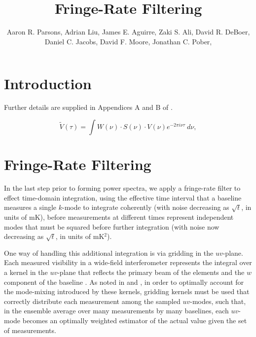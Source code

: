 \documentclass[twocolumn,numberedappendix]{emulateapj}
\begin{document}
\title{Fringe-Rate Filtering}

\author{
Aaron R. Parsons,
Adrian Liu,
James E. Aguirre,
Zaki S. Ali,
David R. DeBoer,
Daniel C. Jacobs,
David F. Moore,
Jonathan C. Pober,
}


\begin{abstract}
\end{abstract}


\section{Introduction}

Further details are supplied in Appendices A and B of \citet{parsons_et_al2013}.

\begin{equation}
\tilde{V}(\tau)=\int{W(\nu)\cdot S(\nu)\cdot V(\nu)e^{-2\pi i\nu\tau}~d\nu},
\label{eq:dtransform}
\end{equation}

\section{Fringe-Rate Filtering}
\label{sec:fringe_rate_filtering}

In the last step prior to forming power spectra,
we apply a fringe-rate filter to effect time-domain integration,
using the effective time interval that a baseline measures a single $k$-mode to integrate coherently
(with noise decreasing
as $\sqrt{t}$, in units of mK), before measurements at different times represent independent modes
that must be squared before further integration (with noise now decreasing as $\sqrt{t}$, in units of mK$^2$).

One way of handling this additional integration is via gridding in the $uv$-plane.
Each measured visibility in a wide-field interferometer represents the integral over a kernel in
the $uv$-plane that reflects the primary beam of the elements \citep{bhatnagar_et_al2008,morales_matejek2009} and the $w$ component 
of the baseline \citep{cornwell_et_al2003}.  As noted in
\citet{sullivan_et_al2012} and \citet{morales_matejek2009},
in order to optimally account for the mode-mixing introduced by these kernels, gridding kernels must be
used that correctly distribute each measurement among the sampled $uv$-modes, such that, in the ensemble average
over many measurements by many baselines, each $uv$-mode becomes an optimally weighted estimator of the actual
value given the set of measurements.
\end{document}
